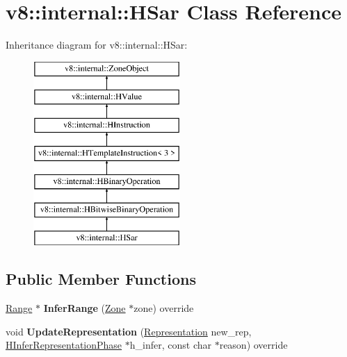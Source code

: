 \hypertarget{classv8_1_1internal_1_1_h_sar}{}\section{v8\+:\+:internal\+:\+:H\+Sar Class Reference}
\label{classv8_1_1internal_1_1_h_sar}
Inheritance diagram for v8\+:\+:internal\+:\+:H\+Sar\+:\begin{figure}[H]
\begin{center}
\leavevmode
\includegraphics[height=7.000000cm]{classv8_1_1internal_1_1_h_sar}
\end{center}
\end{figure}
\subsection*{Public Member Functions}
\begin{DoxyCompactItemize}
\item 
\hyperlink{classv8_1_1internal_1_1_range}{Range} $\ast$ {\bfseries Infer\+Range} (\hyperlink{classv8_1_1internal_1_1_zone}{Zone} $\ast$zone) override\hypertarget{classv8_1_1internal_1_1_h_sar_a60416a0928ea9e496c8178b58cec689c}{}\label{classv8_1_1internal_1_1_h_sar_a60416a0928ea9e496c8178b58cec689c}

\item 
void {\bfseries Update\+Representation} (\hyperlink{classv8_1_1internal_1_1_representation}{Representation} new\+\_\+rep, \hyperlink{classv8_1_1internal_1_1_h_infer_representation_phase}{H\+Infer\+Representation\+Phase} $\ast$h\+\_\+infer, const char $\ast$reason) override\hypertarget{classv8_1_1internal_1_1_h_sar_aa31bd265af7c05613cc6c0ee4a30a9a5}{}\label{classv8_1_1internal_1_1_h_sar_aa31bd265af7c05613cc6c0ee4a30a9a5}

\end{DoxyCompactItemize}

